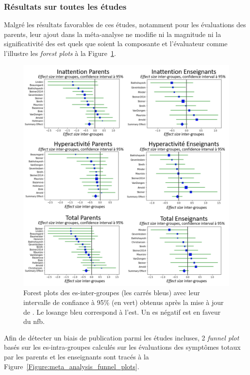 \subsubsection{Résultats sur toutes les études}

Malgré les résultats favorables de ces études, notamment pour les évaluations des parents, leur ajout dans la méta-analyse ne modifie ni la magnitude
ni la significativité des \gls{est} quels que soient la composante et l'évaluateur comme l'illustre les \textit{forest plots} à 
la Figure~\ref{Figure:meta_analysis_forest_plots}.

\begin{figure}[h!]
  \centering
	\includegraphics[width=1\linewidth]{figures/chapter-2/meta-analysis-forest-plots} 
  \caption{Forest plots des \gls{es}-inter-groupes (les carrés bleus) avec leur intervalle de confiance à 95\% (en vert) obtenus après la mise à jour de 
	\citet{Cortese2016}. Le losange bleu correspond à l'\gls{est}.
	Un \gls{es} négatif est en faveur du \gls{nfb}.}
  \label{Figure:meta_analysis_forest_plots}
\end{figure}

Afin de détecter un biais de publication parmi les études incluses, 2 \textit{funnel plot} basés sur les \gls{es}-intra-groupes calculés sur les évaluations
des symptômes totaux par les parents et les enseignants sont tracés à la Figure~\ref{Figure:meta_analysis_funnel_plots}. 


